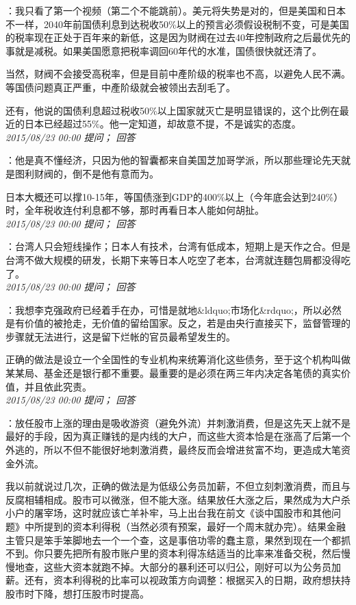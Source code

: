 \documentclass[twocolumn]{ctexart}
\begin{document}
：我只看了第一个视频（第二个不能跳前）。美元将失势是对的，但是美国和日本不一样，2040年前国债利息到达税收50\%以上的预言必须假设税制不变，可是美国的税率现在正处于百年来的新低，这是因为财阀在过去40年控制政府之后最优先的事就是减税。如果美国愿意把税率调回60年代的水准，国债很快就还清了。

当然，财阀不会接受高税率，但是目前中產阶级的税率也不高，以避免人民不满。等国债问题真正严重，中產阶级就会被领出去刮毛了。

还有，他说的国债利息超过税收50\%以上国家就灭亡是明显错误的，这个比例在最近的日本已经超过55\%。他一定知道，却故意不提，不是诚实的态度。\\

\textit{\hfill\noindent\small 2015/08/23 00:00 提问； 回答}

：他是真不懂经济，只因为他的智囊都来自美国芝加哥学派，所以那些理论先天就是图利财阀的，倒不是他有意而为。

日本大概还可以撑10-15年，等国债涨到GDP的400\%以上（今年底会达到240\%）时，全年税收连付利息都不够，那时再看日本人能如何胡扯。\\

\textit{\hfill\noindent\small 2015/08/23 00:00 提问； 回答}

：台湾人只会短线操作；日本人有技术，台湾有低成本，短期上是天作之合。但是台湾不做大规模的研发，长期下来等日本人吃空了老本，台湾就连麵包屑都没得吃了。\\

\textit{\hfill\noindent\small 2015/08/23 00:00 提问； 回答}

：我想李克强政府已经着手在办，可惜是就地\&ldquo;市场化\&rdquo;，所以必然是有价值的被抢走，无价值的留给国家。反之，若是由央行直接买下，监督管理的步骤就无法进行，这是留下烂帐的官员最希望发生的。

正确的做法是设立一个全国性的专业机构来统筹消化这些债务，至于这个机构叫做某某局、基金还是银行都不重要。最重要的是必须在两三年内决定各笔债的真实价值，并且依此究责。\\

\textit{\hfill\noindent\small 2015/08/23 00:00 提问； 回答}

：放任股市上涨的理由是吸收游资（避免外流）并刺激消费，但是这先天上就不是最好的手段，因为真正赚钱的是内线的大户，而这些大资本恰是在涨高了后第一个外逃的，所以不但不能很好地刺激消费，最终反而会增进贫富不均，更造成大笔资金外流。

我以前就说过几次，正确的做法是为低级公务员加薪，不但立刻刺激消费，而且与反腐相辅相成。股市可以微涨，但不能大涨。结果放任大涨之后，果然成为大户杀小户的屠宰场，这时就应该亡羊补牢，马上出台我在前文《谈中国股市和其他问题》中所提到的资本利得税（当然必须有预案，最好一个周末就办完）。结果金融主管只是笨手笨脚地去一个一个查，这是事倍功零的蠢主意，果然到现在一个都抓不到。你只要先把所有股市账户里的资本利得冻结适当的比率来准备交税，然后慢慢地查，这些大资本就跑不掉。大部分的暴利还可以归公，刚好可以为公务员加薪。还有，资本利得税的比率可以视政策方向调整：根据买入的日期，政府想扶持股市时下降，想打压股市时提高。
\end{document}

